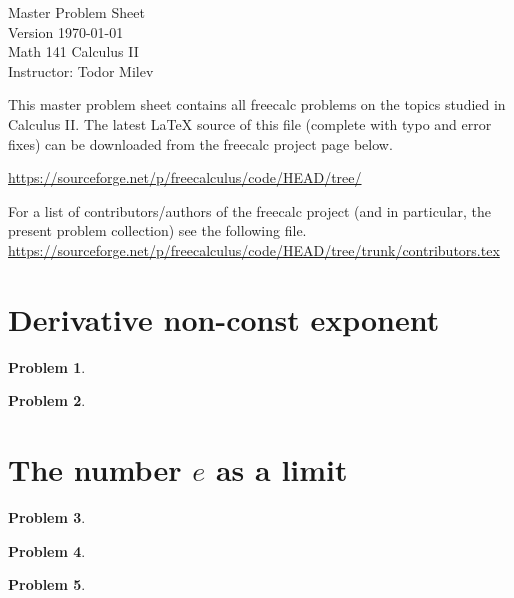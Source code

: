 \documentclass{article}
\newtheorem{problem}{Problem}
\begin{document}
\begin{center}
\Large
Master Problem Sheet \\
Version \today
 \\ Math 141 Calculus II \\ \normalsize Instructor: Todor Milev

\end{center}


This master problem sheet contains all freecalc problems on the topics studied in Calculus II. The latest \LaTeX{} source of this file (complete with typo and error fixes) can be downloaded from the freecalc project page below. 

\url{https://sourceforge.net/p/freecalculus/code/HEAD/tree/}

For a list of contributors/authors of the freecalc project (and in particular, the present problem collection) see the following file.
\url{https://sourceforge.net/p/freecalculus/code/HEAD/tree/trunk/contributors.tex}

\section{Derivative non-const exponent }
\begin{problem}

\end{problem}


\begin{problem}

\end{problem}
\section{The number $e$ as a limit}
\begin{problem}

\end{problem}

\begin{problem}

\end{problem}
\begin{problem}

\end{problem}

\end{document}
